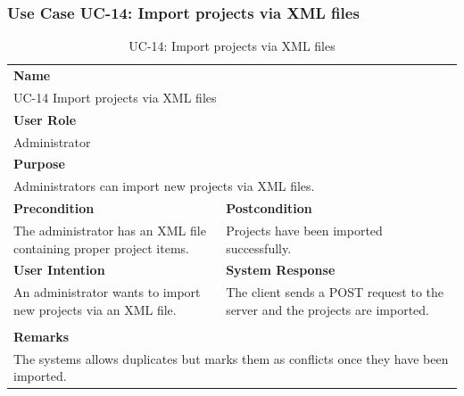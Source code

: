 \subsubsection{Use Case UC-14: Import projects via XML files}\label{subsubsec:use-case-uc-14:-import-projects-via-xml-files}

\begin{table}[H]
    \centering
    \begin{tabular}{|p{}|p{}|}

        \hline
        \multicolumn{2}{|l|}{\rowcolor{gray!50}\textbf{Name}} \\
        \multicolumn{2}{|l|}{UC-14 Import projects via XML files} \\ \hline

        \multicolumn{2}{|l|}{\rowcolor{gray!50}\textbf{User Role}} \\
        \multicolumn{2}{|l|}{Administrator} \\ \hline

        \multicolumn{2}{|l|}{\rowcolor{gray!50}\textbf{Purpose}} \\
        \multicolumn{2}{|l|}{Administrators can import new projects via XML files.} \\ \hline

        \rowcolor{gray!50}\textbf{Precondition} & \rowcolor{gray!50}\textbf{Postcondition} \\
        The administrator has an XML file containing proper project items.
        &
        Projects have been imported successfully.\\ \hline

        \rowcolor{gray!50}\textbf{User Intention} & \rowcolor{gray!50}\textbf{System Response} \\
        An administrator wants to import new projects via an XML file.
        &
        The client sends a POST request to the server and the projects are imported. \\ \hline

        & \\ \hline

        \multicolumn{2}{|l|}{\rowcolor{gray!50}\textbf{Remarks}} \\
        \multicolumn{2}{|p{1\textwidth}|}{The systems allows duplicates but marks them as conflicts once they have been imported.} \\ \hline
    \end{tabular}
    \caption{UC-14: Import projects via XML files}
    \label{tab:uc-import-projects-via-xml-files}
\end{table}

